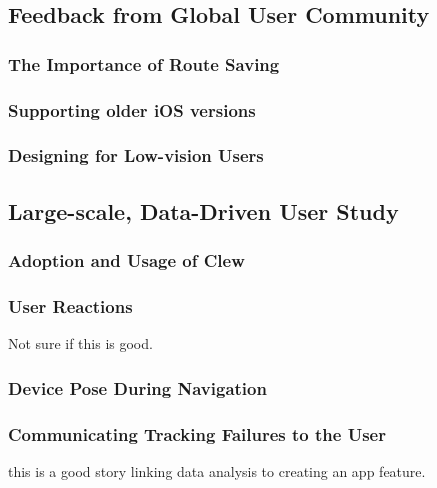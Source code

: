 \documentclass[chi_draft]{sigchi}
\begin{document}
\subsection{Feedback from Global User Community}


\subsubsection{The Importance of Route Saving}


\subsubsection{Supporting older iOS versions}

\subsubsection{Designing for Low-vision Users}

\subsection{Large-scale, Data-Driven User Study}\label{sec:largescalestudy}


\subsubsection{Adoption and Usage of Clew}

\subsubsection{User Reactions}

Not sure if this is good.

\subsubsection{Device Pose During Navigation}

\subsubsection{Communicating Tracking Failures to the User}
this is a good story linking data analysis to creating an app feature.
\end{document}
